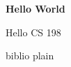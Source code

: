 \documentclass [a4paper, 11pt]
			{article}
\begin{document}
			{\bf Hello World}
\author	{Jon Kiefer S. Yap, Matthew Kendrick Co}

	{\par Hello CS 198 \cite{YapCo2013} \cite{YapCo2014} \cite{ISO9798}}
	
	 {biblio}
	 {plain}
\end{document}
